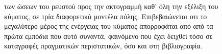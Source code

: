 \begin{figure}[h]
\begin{subfigure}{\textwidth}
  \end{subfigure}
  \caption[ ώσεων στην ακτογραμμή]{ των ώσεων του ρευστού προς
    την ακτογραμμή καθ' όλη την εξέλιξη του κύματος, σε τρία διαφορετικά μοντέλα
    πόλης. Επιβεβαιώνεται οτι το μεγαλύτερο μέρος της ενέργειας του κύματος απορροφάται
    από από τα πρώτα εμπόδια που αυτό συναντά, φαινόμενο που έχει δειχθεί τόσο σε
    καταγραφές πραγματικών περιστατικών, όσο και στη βιβλιογραφία.}
  \label{fig:impulse-fields}
\end{figure}

